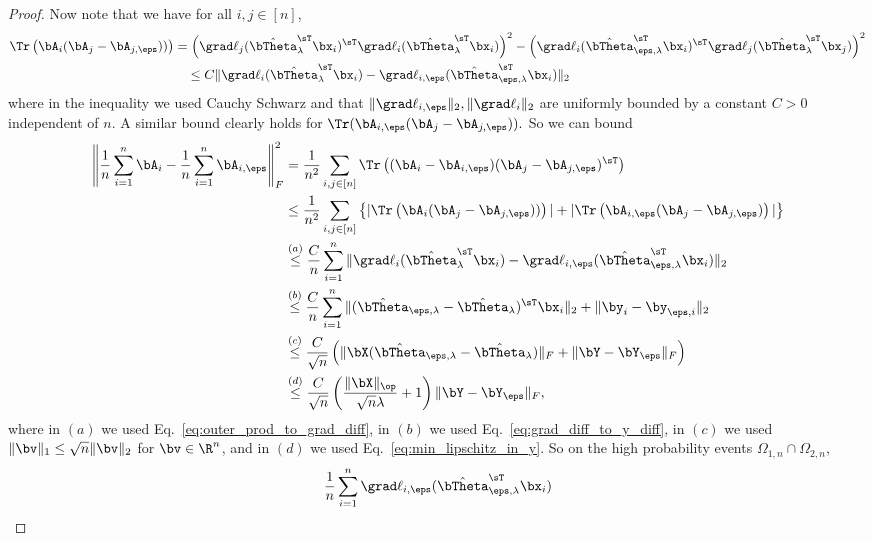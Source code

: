 \begin{proof}
Now note that we have for all $i,j\in[n]$,
\begin{align}
\nonumber
\Tr\left(\bA_i(\bA_j - \bA_{j,\eps}))\right)
&= 
\left(\grad\ell_{j}(\hat\bTheta_\lambda^\sT\bx_i)^\sT
\grad\ell_{i}(\hat\bTheta_\lambda^\sT\bx_i)
\right)^2 -
\left(\grad\ell_{i}(\hat\bTheta_{\eps,\lambda}^\sT\bx_i)^\sT
\grad\ell_{j}(\hat\bTheta_\lambda^\sT\bx_j)
\right)^2\\
\label{eq:outer_prod_to_grad_diff}
&\quad\le
C\|\grad\ell_{i}(\hat\bTheta_\lambda^\sT\bx_i) 
-\grad\ell_{i,\eps}(\hat\bTheta_{\eps,\lambda}^\sT\bx_i)
\|_2
\end{align}
where in the inequality we used Cauchy Schwarz and that $\|\grad \ell_{i,\eps}\|_2,\|\grad \ell_{i}\|_2$ are uniformly bounded by a constant $C>0$ independent of $n$.
A similar bound clearly holds for $\Tr(\bA_{i,\eps}(\bA_j - \bA_{j,\eps})).$
So we can bound
\begin{align}
\label{eq:grad_outer_product_diff}
    \left\|\frac1n\sum_{i=1}^n  
    \bA_i -
    \frac1n\sum_{i=1}^n  \bA_{i,\eps} \right\|_F^2
    &=
    \frac1{n^2} \sum_{i,j\in[n]} \Tr\left((\bA_i-\bA_{i,\eps})(\bA_j-\bA_{j,\eps})^\sT \right)\\
    &\le
    \frac1{n^2} \sum_{i,j\in[n]}\left\{ |\Tr\left(\bA_i(\bA_j - \bA_{j,\eps}))\right)| + |\Tr\left(\bA_{i,\eps}(\bA_j - \bA_{j,\eps})\right)|
    \right\}\\
    &\stackrel{(a)}\le 
    \frac{C}{n}  \sum_{i=1}^n
    \|\grad\ell_{i}(\hat\bTheta_\lambda^\sT\bx_i) 
-\grad\ell_{i,\eps}(\hat\bTheta_{\eps,\lambda}^\sT\bx_i)
\|_2\\
&\stackrel{(b)}{\le}
\frac{C}{n}\sum_{i=1}^n \| (\hat\bTheta_{\eps,\lambda} - \hat\bTheta_{\lambda})^\sT\bx_i \|_2 +\|\by_i - \by_{\eps,i}\|_2\\
&\stackrel{(c)}{\le} \frac{C}{\sqrt{n}} \left( \| \bX (\hat\bTheta_{\eps,\lambda} - \hat\bTheta_{\lambda})\|_F + \| \bY - \bY_{\eps}\|_F\right)\\
& \stackrel{(d)}{\le} \frac{C}{\sqrt{n}}\left(\frac{\|\bX\|_\op}{\sqrt{n}\lambda} + 1\right) \|\bY - \bY_{\eps}\|_F,
\end{align}
where in $(a)$ we used Eq.~\eqref{eq:outer_prod_to_grad_diff}, in $(b)$ we used
Eq.~\eqref{eq:grad_diff_to_y_diff}, in $(c)$ we used $\|\bv\|_1 \le \sqrt{n}\|\bv\|_2$ for $\bv\in\R^{n}$, and in $(d)$ we used Eq.~\eqref{eq:min_lipschitz_in_y}.
So on the high probability events $\Omega_{1,n}\cap\Omega_{2,n}$,
\begin{equation}\label{eq:nablaell_2}
    \frac1n\sum_{i=1}^n \grad\ell_{i,\eps}(\hat\bTheta_{\eps,\lambda}^\sT\bx_i) 

\end{equation}
\end{proof}
